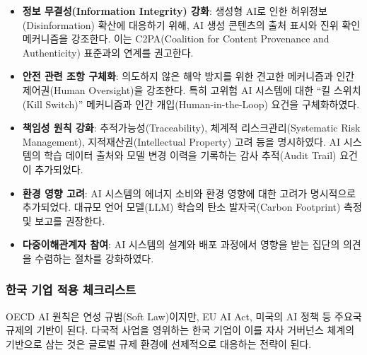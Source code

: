 \begin{itemize}
 \item \textbf{정보 무결성(Information Integrity) 강화}: 생성형 AI로 인한 허위정보(Disinformation) 확산에 대응하기 위해, AI 생성 콘텐츠의 출처 표시와 진위 확인 메커니즘을 강조한다. 이는 C2PA(Coalition for Content Provenance and Authenticity) 표준과의 연계를 권고한다.
 \item \textbf{안전 관련 조항 구체화}: 의도하지 않은 해악 방지를 위한 견고한 메커니즘과 인간 제어권(Human Oversight)을 강조한다. 특히 고위험 AI 시스템에 대한 ``킬 스위치(Kill Switch)'' 메커니즘과 인간 개입(Human-in-the-Loop) 요건을 구체화하였다.
 \item \textbf{책임성 원칙 강화}: 추적가능성(Traceability), 체계적 리스크관리(Systematic Risk Management), 지적재산권(Intellectual Property) 고려 등을 명시하였다. AI 시스템의 학습 데이터 출처와 모델 변경 이력을 기록하는 감사 추적(Audit Trail) 요건이 추가되었다.
 \item \textbf{환경 영향 고려}: AI 시스템의 에너지 소비와 환경 영향에 대한 고려가 명시적으로 추가되었다. 대규모 언어 모델(LLM) 학습의 탄소 발자국(Carbon Footprint) 측정 및 보고를 권장한다.
 \item \textbf{다중이해관계자 참여}: AI 시스템의 설계와 배포 과정에서 영향을 받는 집단의 의견을 수렴하는 절차를 강화하였다.
\end{itemize}

\subsubsection{한국 기업 적용 체크리스트}

OECD AI 원칙은 연성 규범(Soft Law)이지만, EU AI Act, 미국의 AI 정책 등 주요국 규제의 기반이 된다. 다국적 사업을 영위하는 한국 기업이 이를 자사 거버넌스 체계의 기반으로 삼는 것은 글로벌 규제 환경에 선제적으로 대응하는 전략이 된다.

